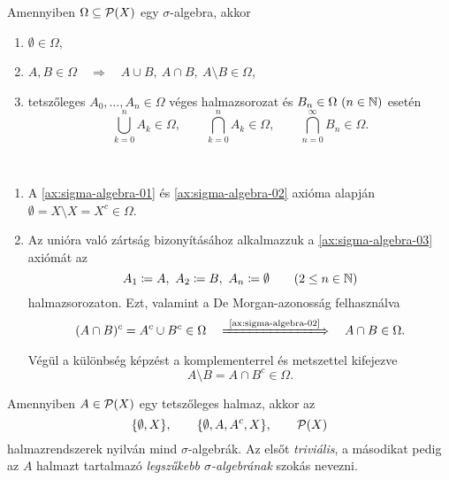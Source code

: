 \documentclass[
]{elteikthesis}[2024/04/26]
\begin{document}
	\begin{stat*}
		Amennyiben \( \Omega \subseteq \mathcal{P}( X ) \) egy \( \sigma \)-algebra, akkor
		\begin{enumerate}
			\item
			\( \emptyset \in \Omega \),
			
			\item
			\( A, B \in \Omega \quad \Longrightarrow \quad A \cup B,\ A \cap B,\ A \setminus B \in \Omega \),
			
			\item
			 tetszőleges \( A_0, \dots, A_n \in \Omega \) véges halmazsorozat és 
			\( B_n \in \Omega \ (n \in \mathbb{N}) \) esetén
			\[
				\bigcup_{k=0}^{n}      A_k \in \Omega, \qquad
				\bigcap_{k=0}^{n}      A_k \in \Omega, \qquad
				\bigcap_{n=0}^{\infty} B_n \in \Omega.
			\]
		\end{enumerate}
	\end{stat*}
	\begin{proof*}\,
		\begin{enumerate}
			\item 
			A \ref{ax:sigma-algebra-01} és \ref{ax:sigma-algebra-02} axióma alapján
			\( \emptyset = X \setminus X = X^c \in \Omega \).
			
			\item Az unióra való zártság bizonyításához alkalmazzuk a
			\ref{ax:sigma-algebra-03} axiómát az
			\[
				A_1 \coloneq A, \ A_2 \coloneq B, \ A_n \coloneq \emptyset
				\qquad (2 \leq n \in \mathbb{N})
			\]
			halmazsorozaton. Ezt, valamint a De Morgan-azonosság felhasználva
			\[
				(A \cap B)^c = A^c \cup B^c \in \Omega
				\quad \xLongrightarrow{\ \text{\ref{ax:sigma-algebra-02}} } \quad
				A \cap B \in \Omega.
			\]
			Végül a különbség képzést a komplementerrel és metszettel kifejezve
			\[
				A \setminus B = A \cap B^c \in \Omega.
			\]
		\end{enumerate}
	\end{proof*}
	
	\begin{example}
		\item Amennyiben \( A \in \mathcal{P}( X ) \) egy tetszőleges halmaz, akkor az
		\[
			\{ \emptyset, X \}, \qquad \{ \emptyset, A, A^c, X \}, \qquad \mathcal{P}( X )
		\]
		halmazrendszerek nyilván mind \( \sigma \)-algebrák. Az elsőt \emph{triviális}, 
		a másodikat pedig az \( A \) halmazt tartalmazó \emph{legszűkebb \( \sigma\)-algebrának} szokás nevezni.
	\end{example}
	
\end{document}

